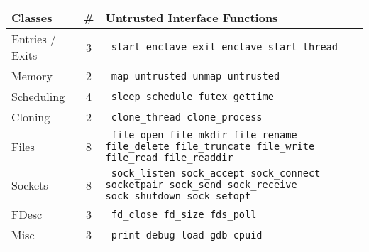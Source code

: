 \footnotesize
\begin{tabular}{lcp{4.5in}}
Classes & \# & Untrusted Interface Functions \\
\hline
Entries / Exits & 3 & {\tt
start\_enclave
exit\_enclave
start\_thread
} \\
\hline
Memory & 2 & {\tt
map\_untrusted
unmap\_untrusted
} \\
\hline
Scheduling & 4 & {\tt
sleep
schedule
futex
gettime
} \\
\hline
Cloning & 2 & {\tt
clone\_thread
clone\_process
} \\
\hline
Files & 8 & {\tt
file\_open
file\_mkdir
file\_rename
file\_delete
file\_truncate
file\_write
file\_read
file\_readdir
} \\
\hline
Sockets & 8 & {\tt
sock\_listen
sock\_accept
sock\_connect
socketpair
sock\_send
sock\_receive
sock\_shutdown
sock\_setopt
} \\
\hline
FDesc & 3 & {\tt
fd\_close
fd\_size
fds\_poll
} \\
\hline
Misc & 3 & {\tt
print\_debug
load\_gdb
cpuid
} \\
\hline
\end{tabular}
